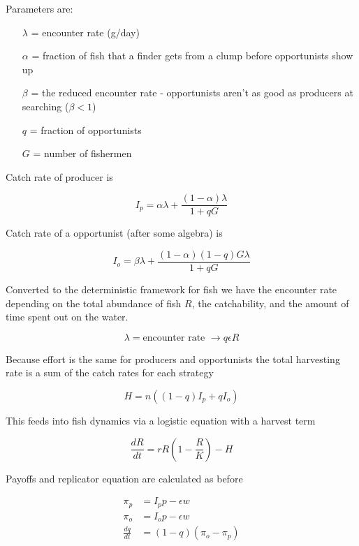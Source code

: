 \documentclass[11pt]{article}
\begin{document}
Parameters are:
\begin{itemize}
\item[$\lambda$] = encounter rate (g/day)
\item[$\alpha$] = fraction of fish that a finder gets from a clump before opportunists show up
\item[$\beta$] = the reduced encounter rate - opportunists aren't as good as producers at searching ($\beta < 1$)
\item[$q$] = fraction of opportunists
\item[$G$] = number of fishermen
\end{itemize}

Catch rate of producer is

\begin{equation}
I_p = \alpha\lambda+\frac{(1-\alpha)\lambda}{1+qG}
\end{equation}

Catch rate of a opportunist (after some algebra) is

\begin{equation}
I_o = \beta\lambda + \frac{(1-\alpha)(1-q)G\lambda}{1+qG}
\end{equation}

Converted to the deterministic framework for fish we have the encounter rate depending on the total abundance of fish $R$, the catchability, and the amount of time spent out on the water.

\[\lambda = \text{encounter rate } \rightarrow q \epsilon R\]

Because effort is the same for producers and opportunists the total harvesting rate is a sum of the catch rates for each strategy

\begin{equation}
H = n((1-q)I_p + qI_o)
\end{equation}

This feeds into fish dynamics via a logistic equation with a harvest term

\begin{equation}
\frac{dR}{dt} = rR\left(1-\frac{R}{K}\right) - H
\end{equation}

Payoffs and replicator equation are calculated as before

\begin{align}
\pi_p & = I_pp - \epsilon w \\
\pi_o & = I_op - \epsilon w \\
\frac{dq}{dt} & = (1-q)(\pi_o - \pi_p)
\end{align}
\end{document}
